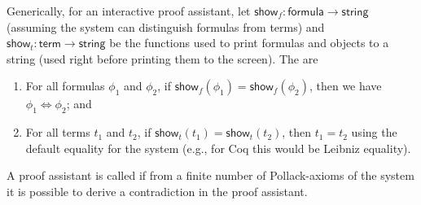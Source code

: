 \begin{node}
\begin{definition}\label{itp-0000}%
Generically, for an interactive proof assistant, let
$\mathsf{show}_{f}\colon\mathsf{formula}\to\mathsf{string}$ (assuming
the system can distinguish formulas from terms) and 
$\mathsf{show}_{t}\colon\mathsf{term}\to\mathsf{string}$ be the
functions used to print formulas and objects to a string (used right
before printing them to the screen). The  are
\begin{enumerate}
\item For all formulas $\phi_{1}$ and $\phi_{2}$, if
  $\mathsf{show}_{f}(\phi_{1})=\mathsf{show}_{f}(\phi_{2})$, then we
  have $\phi_{1}\iff\phi_{2}$; and
\item For all terms $t_{1}$ and $t_{2}$, if $\mathsf{show}_{t}(t_{1})=\mathsf{show}_{t}(t_{2})$,
  then $t_{1}=t_{2}$ using the default equality for the system (e.g.,
  for Coq this would be Leibniz equality).
\end{enumerate}
\end{definition}

\begin{definition}\label{itp-0006}%
A proof assistant is called  if from a
finite number of Pollack-axioms of the system it is possible to derive a
contradiction in the proof assistant.
\end{definition}
\end{node}
